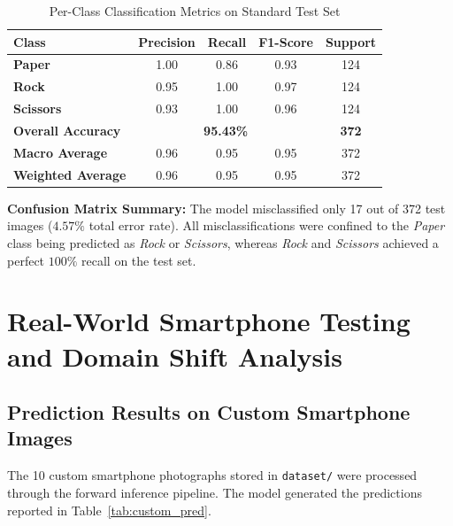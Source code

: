 \documentclass[11pt,a4paper]{article}
\begin{document}
\begin{table}[h!]
\centering
\small
\caption{Per-Class Classification Metrics on Standard Test Set}
\label{tab:metrics}
\begin{tabular}{@{}lcccc@{}}
\toprule
\textbf{Class} & \textbf{Precision} & \textbf{Recall} & \textbf{F1-Score} & \textbf{Support} \\ \midrule
\textbf{Paper} & 1.00 & 0.86 & 0.93 & 124 \\
\textbf{Rock} & 0.95 & 1.00 & 0.97 & 124 \\
\textbf{Scissors} & 0.93 & 1.00 & 0.96 & 124 \\ \midrule
\textbf{Overall Accuracy} & \multicolumn{3}{c}{\textbf{95.43\%}} & \textbf{372} \\
\textbf{Macro Average} & 0.96 & 0.95 & 0.95 & 372 \\
\textbf{Weighted Average} & 0.96 & 0.95 & 0.95 & 372 \\ \bottomrule
\end{tabular}
\end{table}

\noindent \textbf{Confusion Matrix Summary:}
The model misclassified only 17 out of 372 test images ($4.57\%$ total error rate). All misclassifications were confined to the \textit{Paper} class being predicted as \textit{Rock} or \textit{Scissors}, whereas \textit{Rock} and \textit{Scissors} achieved a perfect $100\%$ recall on the test set.

\section{Real-World Smartphone Testing and Domain Shift Analysis}

\subsection{Prediction Results on Custom Smartphone Images}
The 10 custom smartphone photographs stored in \texttt{dataset/} were processed through the forward inference pipeline. The model generated the predictions reported in Table~\ref{tab:custom_pred}.
\end{document}
